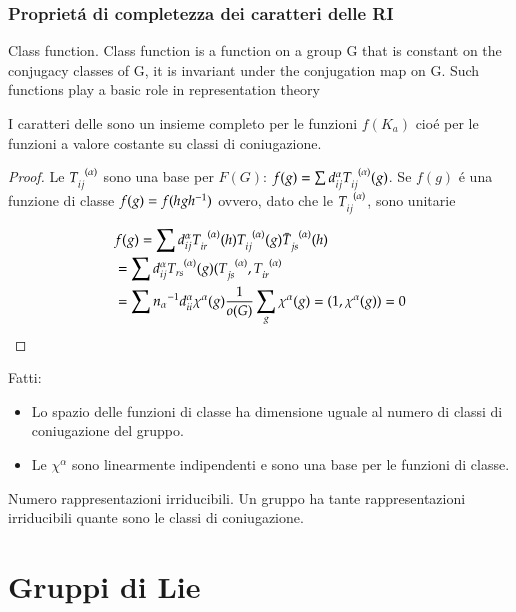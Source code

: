 \documentclass[oneside,12pt]{memoir}
\begin{document}
\subsection{Propriet\'a di completezza dei caratteri delle RI}

\begin{definition}{Class function.}
Class function is a function on a group G that is constant on the conjugacy classes of G, it is invariant under the conjugation map on G. Such functions play a basic role in representation theory
\end{definition}


I caratteri delle \RIs{} sono un insieme completo per le funzioni $f(K_a)$ cio\'e per le funzioni a valore costante su classi di coniugazione.
\begin{proof}
Le $\rapreg{ij}{\alpha}$ sono una base per $F(G)$: $f(g)=\sum d_{ij}^{\alpha}\rapreg{ij}{\alpha}(g)$. Se $f(g)$ \'e una funzione di classe $f(g)=f(hg{{h}^{-1}})$ ovvero, dato che le $\rapreg{ij}{\alpha}$, sono unitarie

\begin{align*}
&f(g)=\sum d_{ij}^{\alpha}\rapreg{ir}{\alpha}(h)\rapreg{ij}{\alpha}(g)\rapregb{js}{\alpha}(h)\\
&=\sum d_{ij}^{\alpha}\rapreg{rs}{\alpha}(g)
(\rapreg{js}{\alpha},\rapreg{ir}{\alpha}\\
&=\sum\invers{n_{\alpha}}d_{ii}^{\alpha}\chi^{\alpha}(g)\frac{1}{o(G)}\sum_g\chi^{\alpha}(g)=(1,\chi^{\alpha}(g))=0
\end{align*}

\end{proof}

Fatti:
\begin{itemize}
\item Lo spazio delle funzioni di classe ha dimensione uguale al numero di classi di coniugazione del gruppo.
\item Le $\chi^{\alpha}$ sono linearmente indipendenti e sono una base per le funzioni di classe.
\end{itemize}

\begin{usefull}{Numero rappresentazioni irriducibili.}
Un gruppo ha tante rappresentazioni irriducibili quante sono le classi di coniugazione.
\end{usefull}

\chapter{Gruppi di Lie}
\PartialToc
\end{document}
